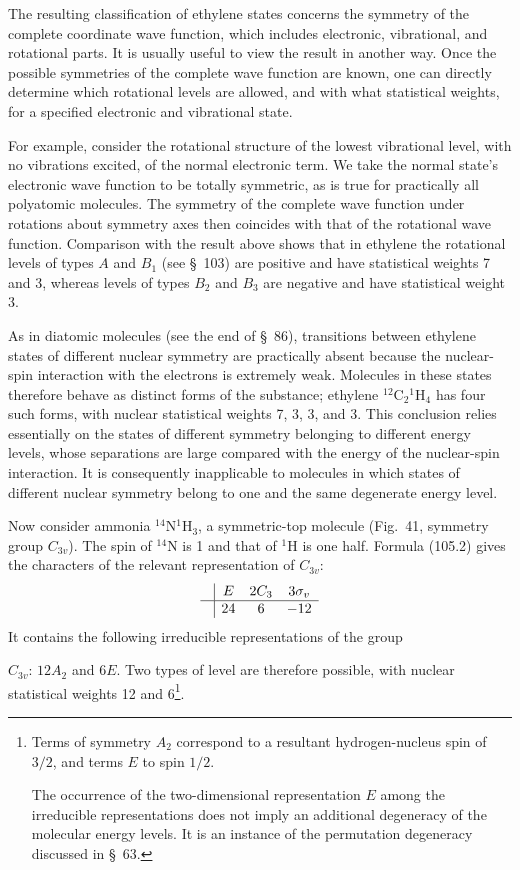 The resulting classification of ethylene states concerns the symmetry of the complete coordinate wave function, which includes electronic, vibrational, and rotational parts. It is usually useful to view the result in another way. Once the possible symmetries of the complete wave function are known, one can directly determine which rotational levels are allowed, and with what statistical weights, for a specified electronic and vibrational state.

For example, consider the rotational structure of the lowest vibrational level, with no vibrations excited, of the normal electronic term. We take the normal state's electronic wave function to be totally symmetric, as is true for practically all polyatomic molecules. The symmetry of the complete wave function under rotations about symmetry axes then coincides with that of the rotational wave function. Comparison with the result above shows that in ethylene the rotational levels of types $A$ and $B_1$ (see \S~103) are positive and have statistical weights 7 and 3, whereas levels of types $B_2$ and $B_3$ are negative and have statistical weight 3.

As in diatomic molecules (see the end of \S~86), transitions between ethylene states of different nuclear symmetry are practically absent because the nuclear-spin interaction with the electrons is extremely weak. Molecules in these states therefore behave as distinct forms of the substance; ethylene ${}^{12}\mathrm C_2{}^1\mathrm H_4$ has four such forms, with nuclear statistical weights 7, 3, 3, and 3. This conclusion relies essentially on the states of different symmetry belonging to different energy levels, whose separations are large compared with the energy of the nuclear-spin interaction. It is consequently inapplicable to molecules in which states of different nuclear symmetry belong to one and the same degenerate energy level.

Now consider ammonia ${}^{14}\mathrm N{}^1\mathrm H_3$, a symmetric-top molecule (Fig.~41, symmetry group $C_{3v}$). The spin of ${}^{14}\mathrm N$ is 1 and that of ${}^1\mathrm H$ is one half. Formula (105.2) gives the characters of the relevant representation of $C_{3v}$:
\[
\begin{array}{c|ccc}&E&2C_3&3\sigma_v\\\hline&24&6&-12\end{array}
\]
It contains the following irreducible representations of the group

$C_{3v}$: $12A_2$ and $6E$. Two types of level are therefore possible, with nuclear statistical weights 12 and 6\footnote{Terms of symmetry $A_2$ correspond to a resultant hydrogen-nucleus spin of $3/2$, and terms $E$ to spin $1/2$.

The occurrence of the two-dimensional representation $E$ among the irreducible representations does not imply an additional degeneracy of the molecular energy levels. It is an instance of the permutation degeneracy discussed in \S~63.}.

